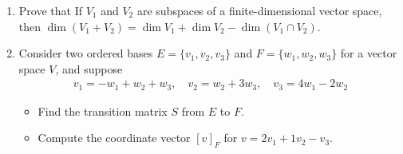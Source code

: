 \documentclass[a4paper,11pt]{article}
\begin{document}
\begin{enumerate}
 
\item Prove that If \(V_1\) and \(V_2\) are subspaces of a finite-dimensional vector space, then
\(\dim(V_1 + V_2)=\dim V_1+\dim V_2 - \dim(V_1\cap V_2)\). 

\item Consider two ordered bases $E=\{v_1,v_2,v_3\}$ and $F=\{w_1,w_2,w_3\}$ for a vector space $V$, and suppose
\begin{align*}
v_1=-w_1+w_2+w_3, \quad v_2=w_2+3w_3, \quad v_3= 4w_1-2w_2
\end{align*}
\begin{itemize}
\item[(a)] Find the transition matrix $S$ from $E$ to $F$.
\item[(b)] Compute the coordinate vector $[v]_F$ for $v=2v_1+1v_2-v_3$.
\end{itemize}



\end{enumerate}
\end{document}
